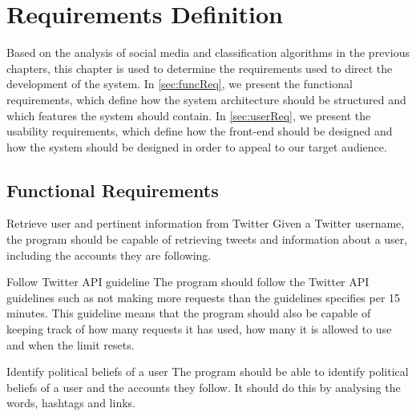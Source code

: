 \chapter{Requirements Definition}\label{cha:req}

Based on the analysis of social media and classification algorithms in the
previous chapters, this chapter is used to determine the requirements used to
direct the development of the system. In \autoref{sec:funcReq}, we present the
functional requirements, which define how the system architecture should be
structured and which features the system should contain. In
\autoref{sec:userReq}, we present the usability requirements, which define how
the front-end should be designed and how the system should be designed in order
to appeal to our target audience.

\section{Functional Requirements}\label{sec:funcReq}

\begin{requirement}{Retrieve user and pertinent information from Twitter}
Given a Twitter username, the program should be capable of retrieving
tweets and information about a user, including the accounts they are following.
\end{requirement}

\begin{requirement}{Follow Twitter \ac{API} guideline} 
The program should follow the Twitter \ac{API} guidelines such as not making
more requests than the guidelines specifies per 15 minutes. This guideline
means that the program should also be capable of keeping track of how many
requests it has used, how many it is allowed to use and when the limit resets. 
\end{requirement}

\begin{requirement}{Identify political beliefs of a user}
The program should be able to identify political beliefs of a user and
the accounts they follow. It should do this by analysing the words, hashtags
and links.

\end{requirement}

